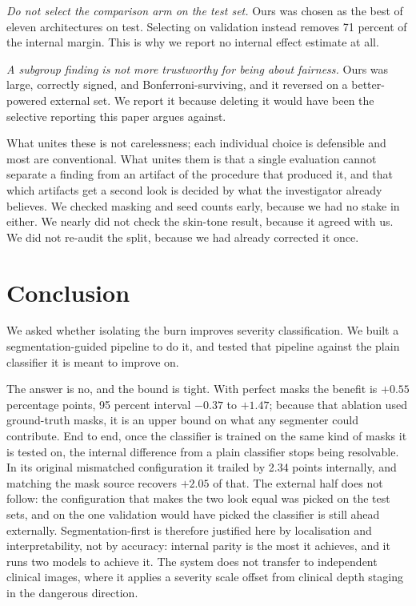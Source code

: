 \documentclass{melba}
\begin{document}
\emph{Do not select the comparison arm on the test set.} Ours was chosen as the best of eleven architectures on test. Selecting on validation instead removes 71 percent of the internal margin. This is why we report no internal effect estimate at all.

\emph{A subgroup finding is not more trustworthy for being about fairness.} Ours was large, correctly signed, and Bonferroni-surviving, and it reversed on a better-powered external set. We report it because deleting it would have been the selective reporting this paper argues against.

What unites these is not carelessness; each individual choice is defensible and most are conventional. What unites them is that a single evaluation cannot separate a finding from an artifact of the procedure that produced it, and that which artifacts get a second look is decided by what the investigator already believes. We checked masking and seed counts early, because we had no stake in either. We nearly did not check the skin-tone result, because it agreed with us. We did not re-audit the split, because we had already corrected it once.

\section{Conclusion}
\label{Con}
We asked whether isolating the burn improves severity classification. We built a segmentation-guided pipeline to do it, and tested that pipeline against the plain classifier it is meant to improve on.

The answer is no, and the bound is tight. With perfect masks the benefit is $+0.55$ percentage points, 95 percent interval $-0.37$ to $+1.47$; because that ablation used ground-truth masks, it is an upper bound on what any segmenter could contribute. End to end, once the classifier is trained on the same kind of masks it is tested on, the internal difference from a plain classifier stops being resolvable. In its original mismatched configuration it trailed by 2.34 points internally, and matching the mask source recovers $+2.05$ of that. The external half does not follow: the configuration that makes the two look equal was picked on the test sets, and on the one validation would have picked the classifier is still ahead externally. Segmentation-first is therefore justified here by localisation and interpretability, not by accuracy: internal parity is the most it achieves, and it runs two models to achieve it. The system does not transfer to independent clinical images, where it applies a severity scale offset from clinical depth staging in the dangerous direction.
\end{document}

